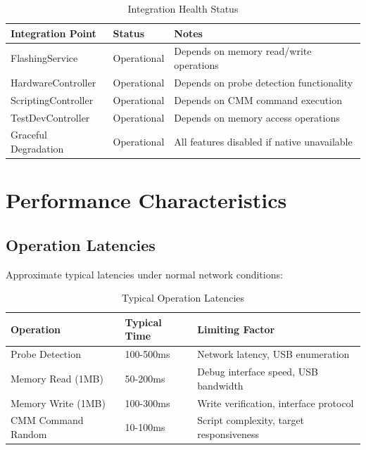 \documentclass[12pt,a4paper]{article}
\begin{document}
\begin{table}[h]
\centering
\begin{tabular}{|p{4cm}|p{3cm}|p{5cm}|}
\hline
\textbf{Integration Point} & \textbf{Status} & \textbf{Notes} \\
\hline
FlashingService & Operational & Depends on memory read/write operations \\
\hline
HardwareController & Operational & Depends on probe detection functionality \\
\hline
ScriptingController & Operational & Depends on CMM command execution \\
\hline
TestDevController & Operational & Depends on memory access operations \\
\hline
Graceful Degradation & Operational & All features disabled if native unavailable \\
\hline
\end{tabular}
\caption{Integration Health Status}
\end{table}

\newpage

\section{Performance Characteristics}

\subsection{Operation Latencies}

Approximate typical latencies under normal network conditions:

\begin{table}[h]
\centering
\begin{tabular}{|p{4cm}|p{3cm}|p{5cm}|}
\hline
\textbf{Operation} & \textbf{Typical Time} & \textbf{Limiting Factor} \\
\hline
Probe Detection & 100-500ms & Network latency, USB enumeration \\
\hline
Memory Read (1MB) & 50-200ms & Debug interface speed, USB bandwidth \\
\hline
Memory Write (1MB) & 100-300ms & Write verification, interface protocol \\
\hline
CMM Command Random & 10-100ms & Script complexity, target responsiveness \\
\hline
\end{tabular}
\caption{Typical Operation Latencies}
\end{table}
\end{document}

